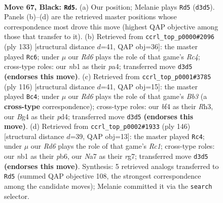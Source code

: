 \documentclass[11pt]{article}
\begin{document}
\clearpage

\begin{figure}[p]\centering
\begin{subfigure}{0.46\textwidth}\centering
\resizebox{\linewidth}{!}{%
\newchessgame
\chessboard[
  setfen={7K/n1P2k2/p7/P4p1p/4pBb1/3r2P1/8/RN6 b - - 41 67},
  showmover=false,
  pgfstyle=straightmove, color=movearrow, markmove={d3-d5}
]}
\caption{}
\end{subfigure}\hfill
\begin{subfigure}{0.46\textwidth}\centering
\resizebox{\linewidth}{!}{%
\newchessgame
\chessboard[
  setfen={8/5pk1/1p6/p1r3P1/Pb1p2K1/3B4/2P2R2/8 b - - 7 67},
  showmover=false,
  pgfstyle=straightmove, color=movearrow, markmove={c5-c6}
]}
\caption{}
\end{subfigure}
\\[4pt]
\begin{subfigure}{0.46\textwidth}\centering
\resizebox{\linewidth}{!}{%
\newchessgame
\chessboard[
  setfen={3b4/5pk1/8/1K2p1p1/3pP1P1/1B3P1R/P7/5r2 w - - 2 59},
  showmover=false,
  pgfstyle=straightmove, color=movearrow, markmove={b3-c4}
]}
\caption{}
\end{subfigure}\hfill
\begin{subfigure}{0.46\textwidth}\centering
\resizebox{\linewidth}{!}{%
\newchessgame
\chessboard[
  setfen={8/2p3r1/1p2k3/pP6/P2pB3/3P4/4PK1b/2R5 w - - 19 74},
  showmover=false,
  pgfstyle=straightmove, color=movearrow, markmove={c1-c4}
]}
\caption{}
\end{subfigure}
\caption{\textbf{Move 67, Black: \texttt{Rd5}.} (a) Our position; Melanie plays \texttt{Rd5} (\texttt{d3d5}). Panels (b)--(d) are the retrieved master positions whose correspondence most drove this move (highest QAP objective among those that transfer to it). (b) Retrieved from \texttt{ccrl\_top\_p0000\#2096} (ply 133) [structural distance $d$=41, QAP obj=36]: the master played \texttt{Rc6}; under $\mu$ our \emph{Rd6} plays the role of that game's \emph{Rc4}; cross-type roles: our \emph{n}b1 as their \emph{p}a4; transferred move \texttt{d3d5} \textbf{(endorses this move)}. (c) Retrieved from \texttt{ccrl\_top\_p0001\#3785} (ply 116) [structural distance $d$=41, QAP obj=15]: the master played \texttt{Bc4}; under $\mu$ our \emph{Rd6} plays the role of that game's \emph{Bb3} (a \textbf{cross-type} correspondence); cross-type roles: our \emph{b}f4 as their \emph{R}h3, our \emph{B}g4 as their \emph{p}d4; transferred move \texttt{d3d5} \textbf{(endorses this move)}. (d) Retrieved from \texttt{ccrl\_top\_p0002\#1933} (ply 146) [structural distance $d$=39, QAP obj=13]: the master played \texttt{Rc4}; under $\mu$ our \emph{Rd6} plays the role of that game's \emph{Rc1}; cross-type roles: our \emph{n}b1 as their \emph{p}b6, our \emph{N}a7 as their \emph{r}g7; transferred move \texttt{d3d5} \textbf{(endorses this move)}. Synthesis: 5 retrieved analogs transferred to \texttt{Rd5} (summed QAP objective 108, the strongest correspondence among the candidate moves); Melanie committed it via the \texttt{search} selector.}
\label{fig:thought-m133}
\end{figure}
\end{document}
